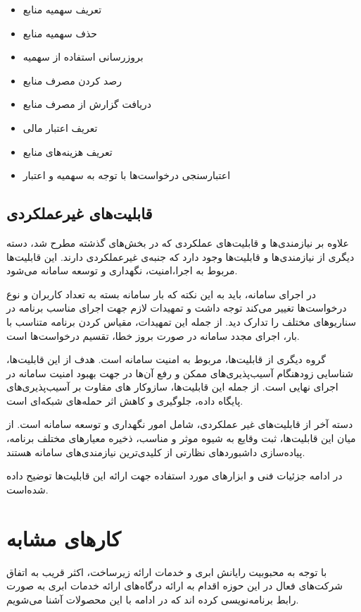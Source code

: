 \begin{itemize}
	\item تعریف سهمیه منابع
	\item حذف سهمیه منابع
	\item بروزرسانی استفاده از سهمیه
	\item رصد کردن مصرف منابع
	\item دریافت گزارش از مصرف منابع
	\item تعریف اعتبار مالی
	\item تعریف هزینه‌های منابع
	\item اعتبارسنجی درخواست‌ها با توجه به سهمیه و اعتبار
\end{itemize}

\subsection{قابلیت‌های غیرعملکردی}
علاوه بر نیازمندی‌ها و قابلیت‌های عملکردی که در بخش‌های گذشته مطرح شد، دسته دیگری از نیازمندی‌ها و قابلیت‌ها وجود دارد که جنبه‌ی غیرعملکردی دارند. این قابلیت‌ها مربوط به اجرا،امنیت، نگهداری و توسعه سامانه می‌شود.

در اجرای سامانه، باید به این نکته که بار سامانه بسته به تعداد کاربران و نوع درخواست‌ها تغییر می‌کند توجه داشت و تمهیدات لازم جهت اجرای مناسب برنامه در سناریو‌های مختلف را تدارک دید. از جمله این تمهیدات، مقیاس کردن برنامه متناسب با بار، اجرای مجدد سامانه در صورت بروز خطا، تقسیم درخواست‌ها است.

گروه دیگری از قابلیت‌ها، مربوط به امنیت سامانه است. هدف از این قابلیت‌ها، شناسایی زودهنگام آسیب‌پذیری‌های ممکن و رفع آن‌ها در جهت بهبود امنیت سامانه در اجرای نهایی است. از جمله این قابلیت‌ها، سازوکار های مقاوت بر آسیب‌پذیری‌های پایگاه داده، جلوگیری و کاهش اثر حمله‌های شبکه‌ای است.

دسته آخر از قابلیت‌های غیر عملکردی، شامل امور نگهداری و توسعه سامانه است. از میان این قابلیت‌ها، ثبت وقایع به شیوه موثر و مناسب، ذخیره معیار‌های مختلف برنامه، پیاده‌سازی داشبوردهای نظارتی از کلیدی‌ترین نیازمندی‌‌های سامانه هستند.

در ادامه جزئیات فنی و ابزار‌های مورد استفاده جهت ارائه این قابلیت‌ها توضیح داده شده‌است.


\section{کارهای مشابه}
با توجه به محبوبیت رایانش ابری و خدمات ارائه زیرساخت، اکثر قریب به اتفاق شرکت‌های فعال در این حوزه اقدام به ارائه درگاه‌های ارائه خدمات ابری به صورت رابط برنامه‌نویسی کرده اند که در ادامه با این محصولات آشنا می‌شویم.

